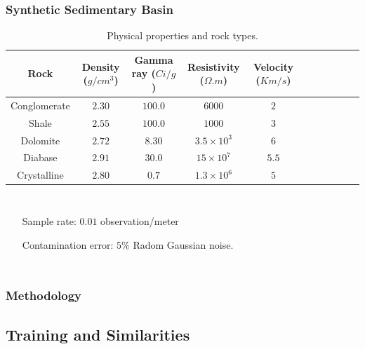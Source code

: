 \documentclass[aspectratio=10]{beamer} %
\begin{document}
\begin{frame}
\frametitle{Synthetic Sedimentary Basin}
\begin{table}[H]\tiny
	\caption{Physical properties and rock types.}
\begin{tabular}{@{}ccccccccccc@{}}
	\toprule
	Rock & Density ($g/cm^{3}$) & Gamma ray ($Ci/g$) & Resistivity ($\Omega.m$)& Velocity ($Km/s$) &\\ \midrule
	Conglomerate &     $2.30$ 		  &       $100.0$       &           $6000$           &			$2$   		   	&\\
	Shale	 &       $2.55$           &       $100.0$       &           $1000$           &     		$3$		 &\\
	Dolomite     &       $2.72$           &       $8.30$        &           $3.5 \times 10^{3}$           &  	$6$    			 &\\
	Diabase    &       $2.91$           &       $30.0$        &           $15 \times 10^{7}$           &      $5.5$				 &\\
	Crystalline  &       $2.80$           &       $0.7$         &           $1.3 \times 10^{6}$           & 		$5$		     &\\ \bottomrule
\end{tabular}

\label{Tab1}
\end{table}
\begin{columns}
	\footnotesize
	\justifying
\begin{itemize}\footnotesize
	\item[Sample rate:] $0.01$ observation/meter 
	\item[Contamination error:] $5$\% Radom Gaussian noise.
\end{itemize}
\end{columns}
\end{frame}

\begin{frame}
	\frametitle{Methodology}
\end{frame}

\subsection{Training and Similarities}
\end{document}
